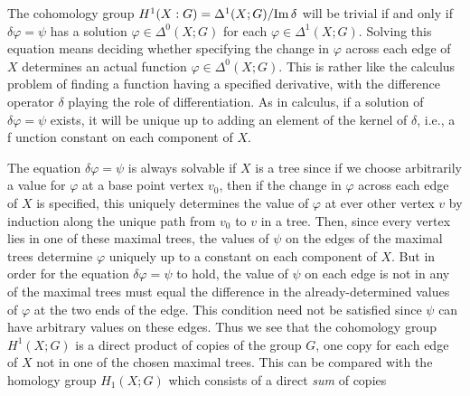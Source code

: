 The cohomology group \(H^1(X:G)=\Delta^1(X;G)/{\operatorname{Im}\delta}\) will be
trivial if and only if \(\delta\varphi=\psi\) has a solution
\(\varphi\in\Delta^0(X;G)\) for each \(\varphi\in\Delta^1(X;G)\). Solving
this equation means deciding whether specifying the change in \(\varphi\)
across each edge of \(X\) determines an actual function
\(\varphi\in\Delta^0(X;G)\). This is rather like the calculus problem of
finding a function having a specified derivative, with the difference
operator \(\delta\) playing the role of differentiation. As in calculus, if
a solution of \(\delta\varphi=\psi\) exists, it will be unique up to adding
an element of the kernel of \(\delta\), i.e., a f unction constant on each
component of \(X\).

The equation \(\delta\varphi=\psi\) is always solvable if \(X\) is a tree
since if we choose arbitrarily a value for \(\varphi\) at a base point
vertex \(v_0\), then if the change in \(\varphi\) across each edge of \(X\)
is specified, this uniquely determines the value of \(\varphi\) at ever
other vertex \(v\) by induction along the unique path from \(v_0\) to \(v\)
in a tree. Then, since every vertex lies in one of these maximal trees, the
values of \(\psi\) on the edges of the maximal trees determine \(\varphi\)
uniquely up to a constant on each component of \(X\). But in order for the
equation \(\delta\varphi=\psi\) to hold, the value of \(\psi\) on each edge
is not in any of the maximal trees must equal the difference in the
already-determined values of \(\varphi\) at the two ends of the edge. This
condition need not be satisfied since \(\psi\) can have arbitrary values on
these edges. Thus we see that the cohomology group \(H^1(X;G)\) is a direct
product of copies of the group \(G\), one copy for each edge of \(X\) not
in one of the chosen maximal trees. This can be compared with the homology
group \(H_1(X;G)\) which consists of a direct \emph{sum} of copies


